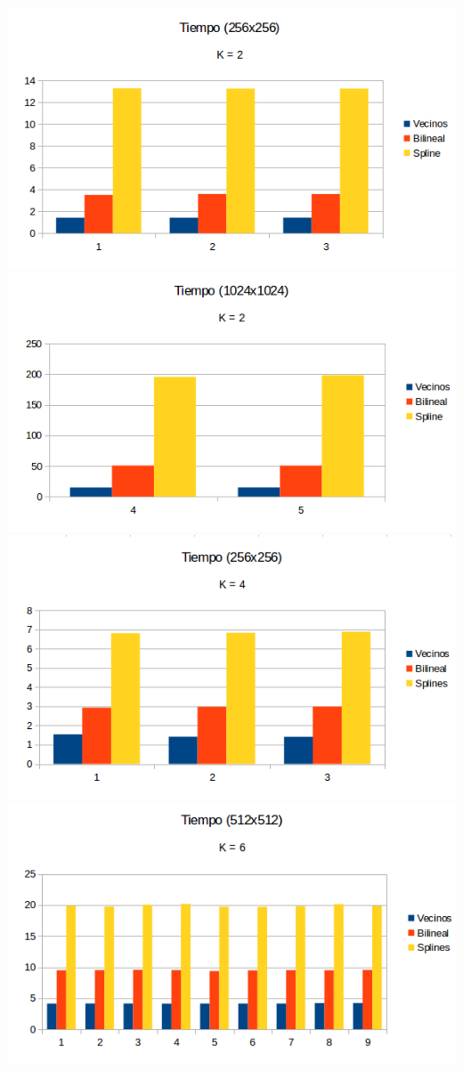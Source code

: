 \begin{center}
\includegraphics[scale=0.50]{imagenes/K2T1.png}
\includegraphics[scale=0.50]{imagenes/K2T2.png}
\includegraphics[scale=0.50]{imagenes/K4T.png}
\includegraphics[scale=0.50]{imagenes/K6T.png}

\end{center}
